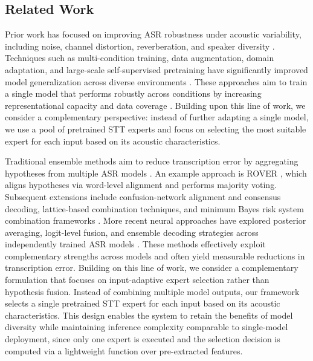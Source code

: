 \documentclass[journal]{IEEEtran}
\begin{document}
    \subsection{Related Work}
    \label{sec:related_work} Prior work has focused on improving ASR robustness
under acoustic variability, including noise, channel distortion, reverberation,
and speaker diversity \cite{prabhavalkar,qian2016vdcnn,fan2021grf,ghorbani2022domain_expansion}. Techniques such as multi-condition training, data augmentation, domain adaptation, and large-scale self-supervised pretraining have significantly improved model generalization
across diverse environments \cite{chen2022_wavlm,pesoparada2022pmct,park2019specaugment,paraskevopoulos2024m2ds2}. These approaches aim to train a single model that performs robustly across conditions by increasing representational capacity and data coverage \cite{baevski2020wav2vec,prabhavalkar,chen2022_wavlm,ghorbani2022domain_expansion}. Building upon this line of work, we consider a complementary perspective:
instead of further adapting a single model, we use a pool of pretrained STT experts
and focus on selecting the most suitable expert for each input based on its acoustic
characteristics.

Traditional ensemble methods aim to reduce transcription error by aggregating
hypotheses from multiple ASR models \cite{mangu2000finding,hoffmeister2006frame_based,goel2000mbr_asr}. An example approach is ROVER \cite{fiscus1997rover}, which aligns hypotheses via word-level alignment and performs majority voting. Subsequent extensions
include confusion-network alignment and consensus decoding, lattice-based combination techniques, and minimum Bayes risk system combination frameworks
\cite{mangu2000finding,hoffmeister2006frame_based,goel2000mbr_asr,goel2004segmental_mbr}. More recent neural approaches have explored posterior averaging, logit-level fusion, and ensemble decoding strategies across independently trained ASR models \cite{liu2021_nbest_fusion,kano2022_attention_fusion,gitman2023confidence_ensembles}. These methods
effectively exploit complementary strengths across models and often yield measurable
reductions in transcription error. Building on this line of work, we consider a complementary formulation that
focuses on input-adaptive expert selection rather than hypothesis fusion.
Instead of combining multiple model outputs, our framework selects a single
pretrained STT expert for each input based on its acoustic characteristics.
This design enables the system to retain the benefits of model diversity while
maintaining inference complexity comparable to single-model deployment, since
only one expert is executed and the selection decision is computed via a
lightweight function over pre-extracted features.
\end{document}

